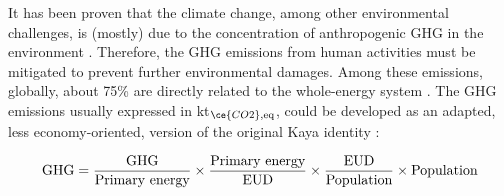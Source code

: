 It has been proven that the climate change, among other environmental challenges, is (mostly) due to the concentration of anthropogenic \gls{GHG} in the environment \cite{IPCC_CO2_budget}. Therefore, the \gls{GHG} emissions from human activities must be mitigated to prevent further environmental damages. Among these emissions, globally, about 75\% are directly related to the whole-energy system \cite{ourworldindata_CO2_world}. The \gls{GHG} emissions usually expressed in kt$_{\ce{CO2},\text{eq}}$, could be developed as an adapted, \ie less economy-oriented, version of the original Kaya identity \cite{kaya1997environment}:

\begin{equation}
\label{eq:equality_GHG}
\mathrm{GHG} =  \frac{\mathrm{GHG}}{\text{Primary energy}} \times \frac{\text{Primary energy}}{\mathrm{EUD}}\times \frac{\mathrm{EUD}}{\text{Population}} \times \text{Population}\\
 \end{equation}


